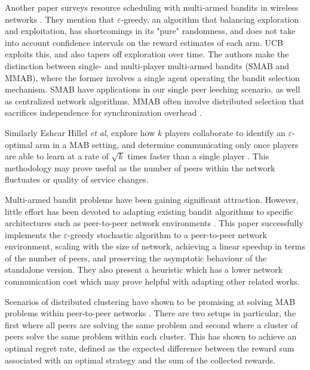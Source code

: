 \documentclass{article}
\begin{document}
Another paper surveys resource scheduling with multi-armed bandits in wireless networks \cite{mab_wireless_scheduling_survey}. They mention that $\varepsilon$-greedy, an 
algorithm that balancing exploration and exploitation, has shortcomings in its "pure" randomness, and does not take into account confidence intervals on the reward estimates 
of each arm. UCB exploits this, and also tapers off exploration over time. The authors make the distinction between single- and multi-player multi-armed bandits (SMAB and 
MMAB), where the former involves a single agent operating the bandit selection mechanism. SMAB have applications in our single peer leeching scenario, as well as centralized 
network algorithms. MMAB often involve distributed selection that sacrifices independence for synchronization overhead \cite{mab_wireless_scheduling_survey}.

Similarly Eshcar Hillel \textit{et al}, explore how $k$ players collaborate to identify an $\varepsilon$-optimal arm in a MAB setting, and determine communicating only
once players are able to learn at a rate of $\sqrt{k}$ times faster than a single player \cite{mab_dist_exploration}. This methodology may prove useful as the number of 
peers within the network fluctuates or quality of service changes. 

Multi-armed bandit problems have been gaining significant attraction. However, little effort has been devoted to adapting existing bandit algorithms to specific architectures 
such as peer-to-peer network environments \cite{gossip_based_distrivuted_stochastic}. This paper successfully implements the $\varepsilon$-greedy stochastic algorithm to a 
peer-to-peer network environment, scaling with the size of network, achieving a linear speedup in terms of the number of peers, and preserving the asymptotic behaviour of the 
standalone version. They also present a heuristic which has a lower network communication cost which may prove helpful with adapting other related works. 

Scenarios of distributed clustering have shown to be promising at solving MAB problems within peer-to-peer networks \cite{dist_clustering_p2p}. There are two setups in 
particular, the first where all peers are solving the same problem and second where a cluster of peers solve the same problem within each cluster. This has shown to achieve 
an optimal regret rate, defined as the expected difference between the reward sum associated with an optimal strategy and the sum of the collected rewards. 
\end{document}

